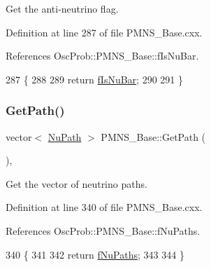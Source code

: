 Get the anti-\/neutrino flag. 

Definition at line 287 of file P\+M\+N\+S\+\_\+\+Base.\+cxx.



References Osc\+Prob\+::\+P\+M\+N\+S\+\_\+\+Base\+::f\+Is\+Nu\+Bar.


\begin{DoxyCode}
287                            \{
288 
289   \textcolor{keywordflow}{return} \hyperlink{classOscProb_1_1PMNS__Base_a0ebaeaefab36a3ff381c6293faedfdd6}{fIsNuBar};
290 
291 \}
\end{DoxyCode}
\mbox{\label{classOscProb_1_1PMNS__Base_ac8e196f2e85a2b1caaf705073ee95a5c}} 
\subsubsection{\texorpdfstring{Get\+Path()}{GetPath()}}
{\footnotesize\ttfamily vector$<$ \hyperlink{structOscProb_1_1NuPath}{Nu\+Path} $>$ P\+M\+N\+S\+\_\+\+Base\+::\+Get\+Path (\begin{DoxyParamCaption}{ }\end{DoxyParamCaption})\hspace{0.3cm}{\ttfamily [virtual]}, {\ttfamily [inherited]}}

Get the vector of neutrino paths. 

Definition at line 340 of file P\+M\+N\+S\+\_\+\+Base.\+cxx.



References Osc\+Prob\+::\+P\+M\+N\+S\+\_\+\+Base\+::f\+Nu\+Paths.


\begin{DoxyCode}
340                                  \{
341 
342   \textcolor{keywordflow}{return} \hyperlink{classOscProb_1_1PMNS__Base_a69db9d57e12fc7cbe0431bc6c18fac93}{fNuPaths};
343 
344 \}
\end{DoxyCode}
\mbox{\label{classOscProb_1_1PMNS__Base_a9eac8d768c1424755ee41f7e783af179}} 
